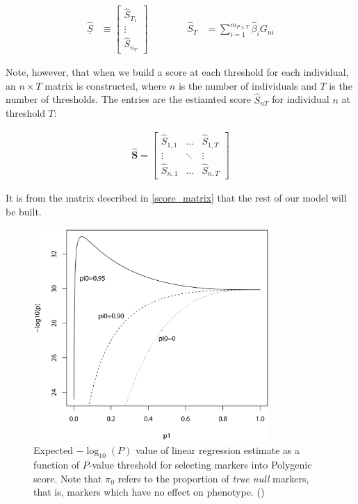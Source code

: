 $$ \begin{aligned} \underline{\hat{S}} &\equiv \begin{bmatrix} \hat{S}_{T_1} \\ \vdots \\ \hat{S}_{n_T} \end{bmatrix} &&&&& \hat{S}_T &= \sum^{m_{P \leq T}}_{i=1} \hat{\beta}_i G_{ni} \end{aligned}$$

Note, however, that when we build a score at each threshold for each individual, an $n \times T$ matrix is constructed, where $n$ is the number of individuals and $T$ is the number of thresholds. The entries are the estiamted score $\hat{S}_{nT}$ for individual $n$ at threshold $T$:

\begin{equation} 
\label{score_matrix}
\begin{aligned}
\mathbf{\hat{S}} = \begin{bmatrix} \hat{S}_{1,1} & \dots & \hat{S}_{1, T} \\ \vdots & \ddots & \vdots \\ \hat{S}_{n, 1} & \dots & \hat{S}_{n, T} \end{bmatrix}
\end{aligned}
\end{equation}

It is from the matrix described in \ref{score_matrix} that the rest of our model will be built.

\begin{figure}[h]
\label{pi0}
\caption{Expected $-\log_{10} (P)$ value of linear regression estimate as a function of $P$-value threshold for selecting markers into Polygenic score. Note that $\pi_0$ refers to the proportion of \textit{true null} markers, that is, markers which have no effect on phenotype. (\cite{Dudbridge2013})}
\centering
\includegraphics[width=0.8\textwidth]{Figures/pi0.png}
\end{figure}

